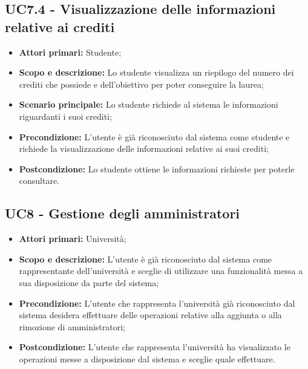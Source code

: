 \documentclass[AnalisiDeiRequisiti.tex]{subfiles}
\begin{document}
\subsection{UC7.4 - Visualizzazione delle informazioni relative ai crediti}
\begin{itemize}
	\item \textbf{Attori primari:} Studente;\\
	\item \textbf{Scopo e descrizione:} Lo studente visualizza un riepilogo del numero dei crediti che possiede e dell'obiettivo per poter conseguire la laurea;\\
	\item \textbf{Scenario principale:} Lo studente richiede al sistema le informazioni riguardanti i suoi crediti;\\
	\item \textbf{Precondizione:} L'utente è già riconosciuto dal sistema come studente e richiede la visualizzazione delle informazioni relative ai suoi crediti;\\
	\item \textbf{Postcondizione:} Lo studente ottiene le informazioni richieste per poterle consultare.\\
\end{itemize}
\subsection{UC8 - Gestione degli amministratori}
\begin{itemize}
	\item \textbf{Attori primari:} Università;\\
	\item \textbf{Scopo e descrizione:} L'utente è già riconosciuto dal sistema come rappresentante dell'università e sceglie di utilizzare una funzionalità messa a sua disposizione da parte del sistema;\\
	\item \textbf{Precondizione:} L'utente che rappresenta l'università già riconosciuto dal sistema desidera effettuare delle operazioni relative alla aggiunta o alla rimozione di amministratori;\\
	\item \textbf{Postcondizione:} L'utente che rappresenta l'università ha visualizzato le operazioni messe a disposizione dal sistema e sceglie quale effettuare.\\
\end{itemize}
\end{document}
